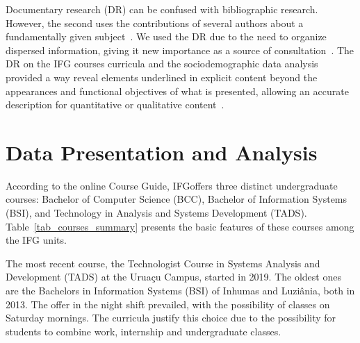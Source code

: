 \documentclass[sigconf, review]{educomp}
\begin{document}
Documentary research (DR) can be confused with bibliographic research. However, the second uses the contributions of several authors about a fundamentally given subject~\cite{gil2008metodos}.
We used the DR due to the need to organize dispersed information, giving it new importance as a source of consultation~\cite{prodanov2013metodologia}.
The DR on the IFG courses curricula and the sociodemographic data analysis provided a way reveal elements underlined in explicit content beyond the appearances and functional objectives of what is presented, allowing an accurate description for quantitative or qualitative content~\cite{bardin2011content, marconi2003fundamentos}.

\section{Data Presentation and Analysis}\label{DataPresentationandAnalysis}
According to the online Course Guide, IFGoffers three distinct undergraduate courses: Bachelor of Computer Science (BCC), Bachelor of Information Systems (BSI), and Technology in Analysis and Systems Development (TADS).
Table~\ref{tab_courses_summary} presents the basic features of these courses among the IFG units.
\begin{table}[!htbp]
\centering
\caption{A summary of the IFG's Computer Science-related undergraduate courses.}
\label{tab_courses_summary}
\end{table}
The most recent course, the Technologist Course in Systems Analysis and Development (TADS) at the Uruaçu Campus, started in 2019.
The oldest ones are the Bachelors in Information Systems (BSI) of Inhumas and Luziânia, both in 2013.
The offer in the night shift prevailed, with the possibility of classes on Saturday mornings.
The curricula justify this choice due to the possibility for students to combine work, internship and undergraduate classes.
\end{document}
